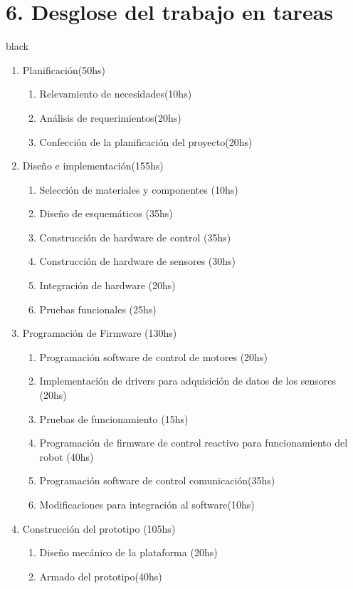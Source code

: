 \documentclass[11pt]{charter}
\begin{document}
\section{6. Desglose del trabajo en tareas}
\label{sec:wbs}
\begin{consigna}{black}
\vspace{-12mm}
\begin{enumerate}
\item Planificación(50hs) 
	\begin{enumerate}
	\item Relevamiento de necesidades(10hs) 
	\item Análisis de requerimientos(20hs) 
	\item Confección de la planificación del proyecto(20hs) 
	\end{enumerate}
\item Diseño e implementación(155hs) 
	\begin{enumerate}
	\item Selección de materiales y componentes (10hs)
	\item Diseño de esquemáticos (35hs) 
	\item Construcción de hardware de control (35hs)
	\item Construcción de hardware de sensores (30hs)
	\item Integración de hardware (20hs)
	\item Pruebas funcionales (25hs) 
	\end{enumerate}
	\item Programación de Firmware (130hs) 
	\begin{enumerate}
	\item Programación software de control de motores  (20hs)
	\item Implementación de drivers para adquisición de datos de los sensores (20hs)
	\item Pruebas de funcionamiento (15hs)
	\item Programación de firmware de control reactivo para funcionamiento del robot (40hs) 
	\item Programación software de control comunicación(35hs) 
	\item Modificaciones para integración al software(10hs) 
	\end{enumerate}
	\item Construcción del prototipo (105hs) 
	\begin{enumerate}
	\item Diseño mecánico de la plataforma (20hs)
	\item Armado del prototipo(40hs)

\end{enumerate}
\end{enumerate}
\end{consigna}
\end{document}
